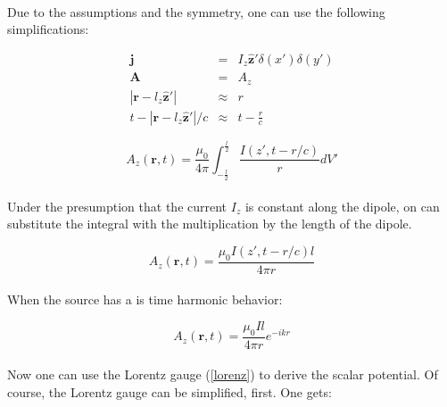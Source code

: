 \documentclass[a4paper,10pt]{thesis}
\begin{document}
\paragraph*{}
Due to the assumptions and the symmetry, one can use the following simplifications:

\begin{eqnarray}
  \mathbf{j} &=& I_z\mathbf{ \hat{z}'} \delta (x') \delta (y') \label{hd_simpli_1}\\
\mathbf{A} &=& A_z \label{hd_simpli_2} \\
|\mathbf{r}-l_z\mathbf{ \hat{z}'}| &\approx& r \label{hd_simpli_3}\\
t-|\mathbf{r}-l_z\mathbf{ \hat{z}'}| / c &\approx& t-\frac{r}{c}\label{hd_simpli_4}
\end{eqnarray}

\begin{equation}\label{simple_potential_solution}
 A_z (\mathbf{r},t) = \frac{ \mu_0}{4 \pi}\int^{\frac{l}{2}}_{-\frac{l}{2}} \frac{ I ( z', t- r/c  )}{r}  dV'
\end{equation}

\paragraph*{}
Under the presumption that the current $I_z$ is constant along the dipole, on can substitute the integral with the multiplication by the length of the dipole.

\begin{equation}\label{simple_potential_solution2}
 A_z (\mathbf{r},t) = \frac{ \mu_0 I ( z', t- r/c  ) l}{4 \pi r}
\end{equation}

\paragraph*{}
When the source has a is time harmonic behavior:

\begin{equation}\label{simple_potential_solution_timeharmonic}
 A_z (\mathbf{r},t) = \frac{\mu_0 I l}{4 \pi r} e^{-ikr }
\end{equation}

\paragraph*{}
Now one can use the Lorentz gauge (\ref{lorenz}) to derive the scalar potential. Of course, the Lorentz gauge can be simplified, first. One gets:
\end{document}
